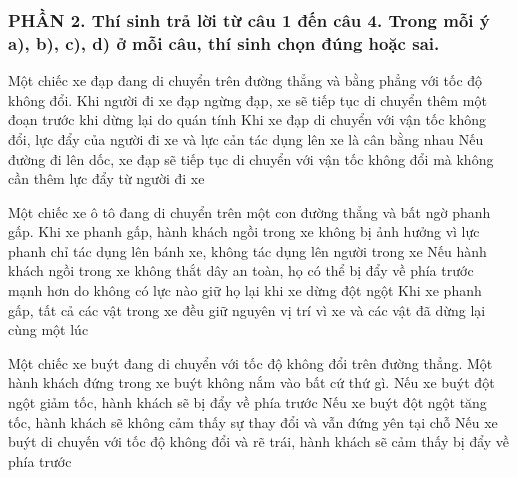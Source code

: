 \subsubsection*{PHẦN 2. Thí sinh trả lời từ câu 1 đến câu 4. Trong mỗi ý a), b), c), d) ở mỗi câu, thí sinh chọn đúng hoặc sai.}
\setcounter{ex}{0}
\begin{ex}%
Một chiếc xe đạp đang di chuyển trên đường thẳng và bằng phẳng với tốc độ không đổi.
{\True Khi người đi xe đạp ngừng đạp, xe sẽ tiếp tục di chuyển thêm một đoạn trước khi dừng lại do quán tính} 
{\True Khi xe đạp di chuyển với vận tốc không đổi, lực đẩy của người đi xe và lực cản tác dụng lên xe là cân bằng nhau} 
{Nếu đường đi lên dốc, xe đạp sẽ tiếp tục di chuyển với vận tốc không đổi mà không cần thêm lực đẩy từ người đi xe} 
\loigiai{}
\end{ex}
\begin{ex}%
Một chiếc xe ô tô đang di chuyển trên một con đường thẳng và bất ngờ phanh gấp.
{Khi xe phanh gấp, hành khách ngồi trong xe không bị ảnh hưởng vì lực phanh chỉ tác dụng lên bánh xe, không tác dụng lên người trong xe} 
{\True Nếu hành khách ngồi trong xe không thắt dây an toàn, họ có thể bị đẩy về phía trước mạnh hơn do không có lực nào giữ họ lại khi xe dừng đột ngột} 
{Khi xe phanh gấp, tất cả các vật trong xe đều giữ nguyên vị trí vì xe và các vật đã dừng lại cùng một lúc} 
\loigiai{}
\end{ex}
\begin{ex}%
Một chiếc xe buýt đang di chuyển với tốc độ không đổi trên đường thẳng. Một hành khách đứng trong xe buýt không nắm vào bất cứ thứ gì.
{\True Nếu xe buýt đột ngột giảm tốc, hành khách sẽ bị đẩy về phía trước} 
{Nếu xe buýt đột ngột tăng tốc, hành khách sẽ không cảm thấy sự thay đổi và vẫn đứng yên tại chỗ} 
{Nếu xe buýt di chuyến với tốc độ không đổi và rẽ trái, hành khách sẽ cảm thấy bị đẩy về phía trước} 
\loigiai{}
\end{ex}
